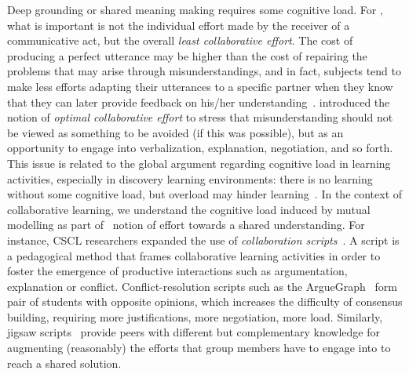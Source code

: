 \documentclass[natbib]{svjour3}
\begin{document}
Deep grounding or shared meaning making requires some cognitive load. For
\citet{clark1986referring}, what is important is not the individual effort made
by the receiver of a communicative act, but the overall \emph{least collaborative
effort}.  The cost of producing a perfect utterance may be higher than the cost
of repairing the problems that may arise through misunderstandings, and in fact,
subjects tend to make less efforts adapting their utterances to a specific
partner when they know that they can later provide feedback on his/her
understanding~\citep{schober1993spatial}. \citet{dillenbourg1995evolution} introduced the notion of
\emph{optimal collaborative effort} to stress
that misunderstanding should not be viewed as something to be avoided (if this
was possible), but as an opportunity to engage into verbalization, explanation,
negotiation, and so forth. This issue is related to the global argument
regarding cognitive load in learning activities, especially in discovery
learning environments: there is no learning without some cognitive load, but
overload may hinder learning~\citep{paas2003cognitive}. In the context of
collaborative learning, we understand the cognitive load induced by mutual
modelling as part of~\citet{schwartz1995emergence} notion of effort towards a
shared understanding. For instance, CSCL researchers expanded the use of
\emph{collaboration scripts}~\citep{kobbe2007specifying}. A script is a pedagogical
method that frames collaborative learning activities in order to foster the
emergence of productive interactions such as argumentation, explanation or
conflict. Conflict-resolution scripts such as the {\sc
ArgueGraph}~\citep{dillenbourg2008mechanics} form pair of students with
opposite opinions, which increases the difficulty of consensus building,
requiring more justifications, more negotiation, more load. Similarly, {\sc
jigsaw} scripts~\citep{aronson1978jigsaw} provide peers with different but
complementary knowledge for augmenting (reasonably) the efforts that group members
have to engage into to reach a shared solution. 
\end{document}
